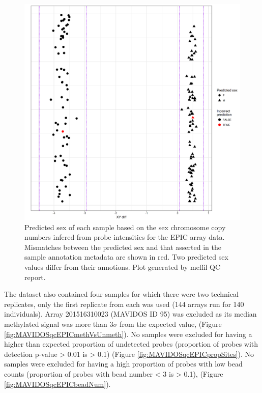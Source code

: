 \documentclass[]{book}
\begin{document}
\begin{figure}

{\centering \includegraphics[width=0.8\linewidth]{figs/MAVIDOSqcEPICsexMismatch} 

}

\caption{Predicted sex of each sample based on the sex chromosome copy numbers infered from probe intensities for the EPIC array data. Mismatches between the predicted sex and that asserted in the sample annotation metadata are shown in red. Two predicted sex values differ from their annotions. Plot generated by meffil QC report.}\label{fig:MAVIDOSqcEPICsexMismatch}
\end{figure}



The dataset also contained four samples for which there were two technical replicates, only the first replicate from each was used (144 arrays run for 140 individuals). Array 201516310023 (MAVIDOS ID 95) was excluded as its median methylated signal was more than \(3\sigma\) from the expected value, (Figure \ref{fig:MAVIDOSqcEPICmethVsUnmeth}). No samples were excluded for having a higher than expected proportion of undetected probes (proportion of probes with detection p-value \textgreater{} 0.01 is \textgreater{} 0.1) (Figure \ref{fig:MAVIDOSqcEPICpropSites}). No samples were excluded for having a high proportion of probes with low bead counts (proportion of probes with bead number \textless{} 3 is \textgreater{} 0.1), (Figure \ref{fig:MAVIDOSqcEPICbeadNum}).
\end{document}
